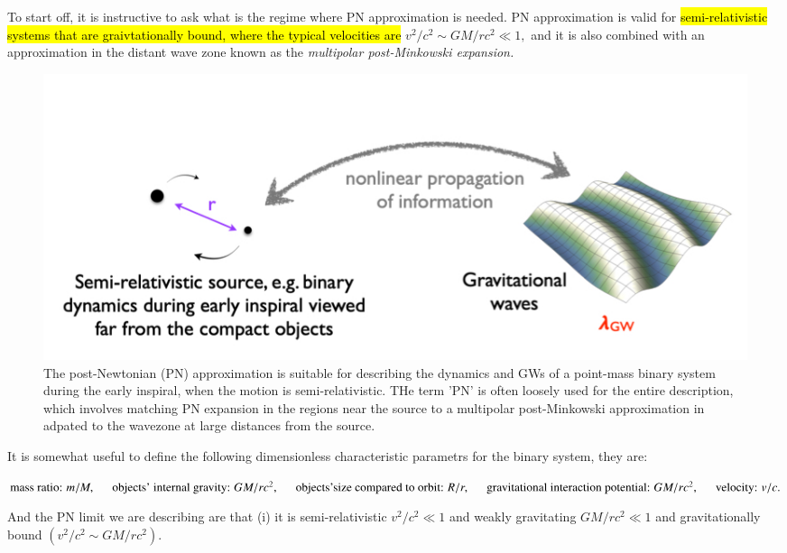 \documentclass[a4paper, 12pt]{article}
\begin{document}
    To start off, it is instructive to ask what is the regime where PN
    approximation is needed. PN approximation is valid for
    \hl{semi-relativistic systems that are graivtationally bound, where
    the typical velocities are } \(  v^2 / c^2 \sim GM / r c^2 \ll 1, \)
    and it is also combined with an approximation in the distant wave
    zone known as the \textit{multipolar post-Minkowski expansion.}
\begin{figure}[h!]
\begin{center}
  \includegraphics[scale=0.5]{Figures/PNapprox.jpeg}
\end{center}
  \caption{The post-Newtonian (PN) approximation is suitable for describing
  the dynamics and GWs of a point-mass binary system during the early
  inspiral, when the motion is semi-relativistic. THe term 'PN' is often
  loosely used for the entire description, which involves matching
  PN expansion in the regions near the source to a multipolar
  post-Minkowski approximation in adpated to the wavezone at large
  distances from the source.}
\label{fig:PN approximation}
\end{figure}



It is somewhat useful to define the following dimensionless
characteristic parametrs for the binary system, they are: 

\(  \textnormal{mass ratio: } m/M, \hspace{0.5cm} \textnormal{objects' internal
gravity: }GM/rc^2,\\
\hspace{0.5cm} \textnormal{objects'size compared to orbit: } R/r, \hspace{0.5cm}
\textnormal{gravitational interaction potential: } GM/rc^2,
\hspace{0.5cm}\textnormal{velocity: } 
v/c. \)

And the PN limit we are describing are that (i) it is semi-relativistic
\(  v^2 / c^2 \ll 1 \) and weakly gravitating \( GM/rc^2 \ll 1 \) and
gravitationally bound \( ( v^2/c^2 \sim GM/rc^2 ) \). 
\end{document}
